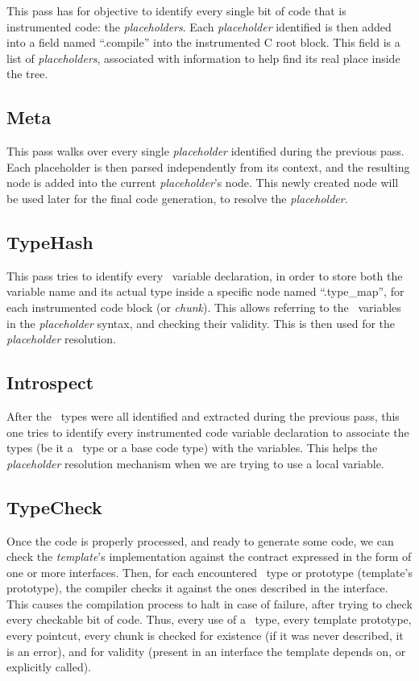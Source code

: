 \documentclass[american]{rtxreport}
\begin{document}
This pass has for objective to identify every single bit of code that is
instrumented code: the \emph{placeholders}. Each \emph{placeholder}
identified is then added into a field named ``.compile'' into the
instrumented C root block. This field is a list of \emph{placeholders},
associated with information to help find its real place inside the tree.

\subsection{Meta}

This pass walks over every single \emph{placeholder} identified during the
previous pass. Each placeholder is then parsed independently from its context,
and the resulting node is added into the current \emph{placeholder}'s node.
This newly created node will be used later for the final code generation, to
resolve the \emph{placeholder}.

\subsection{TypeHash}

This pass tries to identify every \rtx\ variable declaration, in order to store
both the variable name and its actual type inside a specific node named
``.type\_map'', for each instrumented code block (or \emph{chunk}). This allows
referring to the \rtx\ variables in the \emph{placeholder} syntax, and checking
their validity. This is then used for the \emph{placeholder} resolution.

\subsection{Introspect}

After the \rtx\ types were all identified and extracted during the previous
pass, this one tries to identify every instrumented code variable declaration
to associate the types (be it a \rtx\ type or a base code type) with the
variables. This helps the \emph{placeholder} resolution mechanism when we are
trying to use a local variable.

\subsection{TypeCheck}

Once the code is properly processed, and ready to generate some code, we can
check the \emph{template}'s implementation against the contract expressed in
the form of one or more interfaces. Then, for each encountered \rtx\ type or
prototype (template's prototype), the compiler checks it against the ones
described in the interface. This causes the compilation process to halt in
case of failure, after trying to check every checkable bit of code. Thus,
every use of a \rtx\ type, every template prototype, every pointcut, every
chunk is checked for existence (if it was never described, it is an error),
and for validity (present in an interface the template depends on, or
explicitly called).
\end{document}
